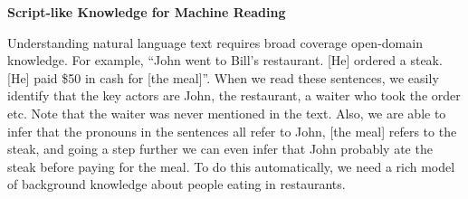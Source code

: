 \documentclass[a4paper,11pt,onecolumn]{article}
\begin{document}

{\bf Script-like Knowledge for Machine Reading}

Understanding natural language text requires broad coverage open-domain knowledge. For example, ``John went to Bill's restaurant. [He] ordered a steak. [He] paid \$50 in cash for [the meal]''. When we read these sentences, we easily identify that the key actors are John, the restaurant, a waiter who took the order etc. Note that the waiter was never mentioned in the text. Also, we are able to infer that the pronouns in the sentences all refer to John, [the meal] refers to the steak, and going a step further we can even infer that John probably ate the steak before paying for the meal. To do this automatically, we need a rich model of background knowledge about people eating in restaurants.

\end{document}
